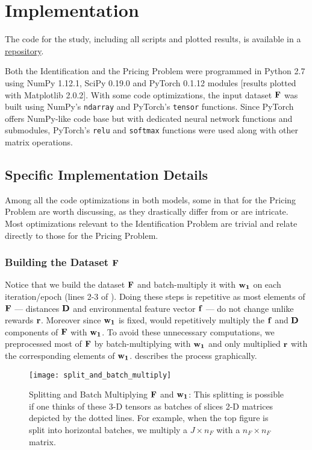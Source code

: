 \appendix
\chapter{Implementation} \label{app:Implementation}
The code for the study, including all scripts and plotted results, is available in a \href{https://github.com/anmolkabra}{repository}.

Both the Identification and the Pricing Problem were programmed in Python 2.7 using NumPy 1.12.1, SciPy 0.19.0 and PyTorch 0.1.12 modules \cite{NPDocs,SCPOptimizeDocs,PTDocs} [results plotted with Matplotlib 2.0.2]. With some code optimizations, the input dataset $\tens{F}$ was built using NumPy's \texttt{ndarray} and PyTorch's \texttt{tensor} functions. Since PyTorch offers NumPy-like code base but with dedicated neural network functions and submodules, PyTorch's \texttt{relu} and \texttt{softmax} functions were used along with other matrix operations.

\section{Specific Implementation Details} \label{app:Specific Implementation Details}
Among all the code optimizations in both models, some in that for the Pricing Problem are worth discussing, as they drastically differ from  or are intricate. Most optimizations relevant to the Identification Problem are trivial and relate directly to those for the Pricing Problem.

\subsection{Building the Dataset $\tens{F}$} \label{app:Building the Dataset F}
Notice that we build the dataset $\tens{F}$ and batch-multiply it with $\matr{w_1}$ on each iteration/epoch (lines 2-3 of ). Doing these steps is repetitive as most elements of $\tens{F}$ --- distances $\mathbf{D}$ and environmental feature vector $\mathbf{f}$ --- do not change unlike rewards $\mathbf{r}$. Moreover since $\matr{w_1}$ is fixed,  would repetitively multiply the $\mathbf{f}$ and $\mathbf{D}$ components of $\tens{F}$ with $\matr{w_1}$. To avoid these unnecessary computations, we preprocessed most of $\tens{F}$ by batch-multiplying with $\matr{w_1}$ and only multiplied $\mathbf{r}$ with the corresponding elements of $\matr{w_1}$.  describes the process graphically.
\begin{figure}[!htbp]
    \centering
    \texttt{[image: split\_and\_batch\_multiply]}
    \caption[Splitting and Batch Multiplying $\tens{F}$ and $\matr{w_1}$]{Splitting and Batch Multiplying $\tens{F}$ and $\matr{w_1}$: This splitting is possible if one thinks of these 3-D tensors as batches of slices 2-D matrices depicted by the dotted lines. For example, when the top figure is split into horizontal batches, we multiply a $J \times n_F$ with a $n_F \times n_F$ matrix.}
    \label{fig:Splitting and Batch Multiplying F and w1}
\end{figure}

